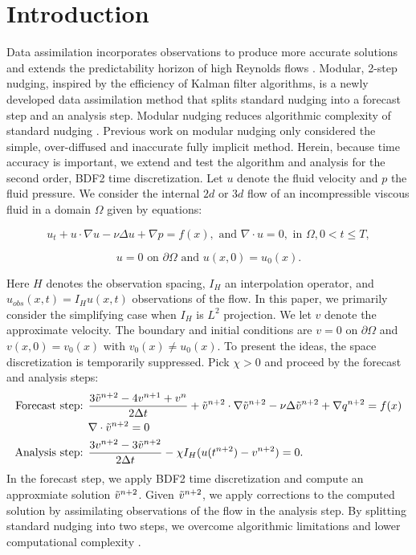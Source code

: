 \documentclass[11pt,a4paper]{article}
\begin{document}
\section{Introduction}
Data assimilation incorporates observations to produce more accurate solutions and extends the predictability horizon of high Reynolds flows \cite{Kalnay:2003}. Modular, 2-step nudging, inspired by the efficiency of Kalman filter algorithms, is a newly developed data assimilation method that splits standard nudging into a forecast step and an analysis step. Modular nudging reduces algorithmic complexity of standard nudging \cite{Fang:2025}. Previous work on modular nudging only considered the simple, over-diffused and inaccurate fully implicit method. Herein, because time accuracy is important, we extend and test the algorithm and analysis for the second order, BDF2 time discretization. Let $u$ denote the fluid velocity and $p$ the fluid pressure. We consider the internal $2d$ or $3d$ flow of an  incompressible viscous fluid in a domain $\Omega$ given by equations:


\begin{equation}
    u_t+u\cdot \nabla u -\nu \Delta u + \nabla p = f(x), \text{ and } \nabla \cdot u=0, \text{ in } \Omega, 0<t\leq T,
\end{equation}

\begin{equation}
    u=0 \text{ on } \partial \Omega \text{ and } u(x,0)=u_0(x).
\end{equation}

Here $H$ denotes the observation spacing, $I_H$ an interpolation operator, and $u_{obs}(x,t)=I_H u(x,t)$ observations of the flow. In this paper, we primarily consider the simplifying case when $I_H$ is $L^2$ projection. We let $v$ denote the approximate velocity. The boundary and initial conditions are $v=0$ on $\partial \Omega$ and $v(x,0)=v_0(x)$ with $v_0(x)\neq u_0(x)$. To present the ideas, the space discretization is temporarily suppressed. Pick $\chi>0$ and proceed by the forecast and analysis steps:
\begin{align}
    \text{Forecast step: } &\frac{3\Tilde{v}^{n+2}-4v^{n+1}+v^n}{2\Delta t}+\Tilde{v}^{n+2} \cdot \nabla \Tilde{v}^{n+2} - \nu \Delta \Tilde{v}^{n+2} + \nabla q^{n+2}=f(x) \\ &\nabla \cdot \Tilde{v}^{n+2} = 0 \\
    \text{Analysis step: }
    &\frac{3v^{n+2}-3\Tilde{v}^{n+2}}{2\Delta t}-\chi I_H(u(t^{n+2})-v^{n+2})=0.
\end{align}
In the forecast step, we apply BDF2 time discretization and compute an approxmiate solution $\Tilde{v}^{n+2}$. Given $\Tilde{v}^{n+2}$, we apply corrections to the computed solution by assimilating observations of the flow in the analysis step. By splitting standard nudging into two steps, we overcome algorithmic limitations and lower computational complexity \cite{Fang:2025}.
\end{document}
